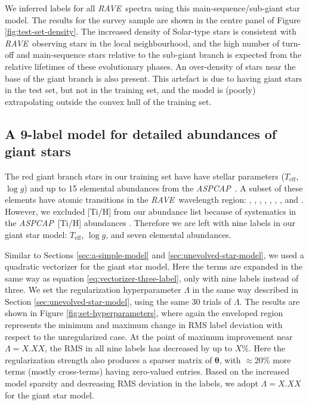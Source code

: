 \documentclass[preprint,trackchanges]{aastex}
\newcommand{\acronym}[1]{{\small{#1}}}
\newcommand{\project}[1]{\textsl{#1}}
\newcommand{\rave}{\project{\acronym{RAVE}}}
\newcommand{\aspcap}{\project{\acronym{ASPCAP}}}
\newcommand{\teff}{T_{\mathrm{eff}}}
\newcommand{\logg}{\log g}
\newcommand{\Dvector}[1]{\boldsymbol{#1}}
\newcommand{\vectheta}{\Dvector{\theta}}
\begin{document}
We inferred labels for all \rave\ spectra using this main-sequence/sub-giant star model.  
The results for the survey sample are shown in the centre panel of Figure \ref{fig:test-set-density}.  
The increased density of Solar-type stars is consistent with \rave\
observing stars in the local neighbourhood, and the high number of turn-off
and main-sequence stars relative to the sub-giant branch is expected from 
the relative lifetimes of these evolutionary phases.  An over-density
of stars near the base of the giant branch is also present.  This artefact is due 
to having giant stars in the test set, but not in the training set, and the
model is (poorly) extrapolating outside the convex hull of the training set.


\subsection{A 9-label model for detailed abundances of giant stars}
\label{sec:evolved-star-model}

The red giant branch stars in our training set have have stellar parameters 
($\teff$, $\logg$) and up to 15 elemental abundances from the \aspcap\ 
\citep{Garcia_Perez_2016}.  A subset of these elements have atomic transitions in the 
\rave\ wavelength region: \ion{O}{1}, \ion{Mg}{1}, \ion{Al}{1}, , 
\ion{Ca}{2}, \ion{Ti}{1}, \ion{Fe}{1}, and \ion{Ni}{1}.  However, we 
excluded [Ti/H] from our abundance list because of systematics in the \aspcap\
[Ti/H] abundances \citep{Holtzman_2015,Hawkins_2016}.  Therefore we are left 
with nine labels in our giant star model: $\teff$, $\logg$, and seven elemental 
abundances.  


Similar to Sections \ref{sec:a-simple-model} and \ref{sec:unevolved-star-model},
we used a quadratic vectorizer for the giant star model.  Here the terms are 
expanded in the same way as equation \ref{eq:vectorizer-three-label}, only
with nine labels instead of three.  We set the regularization hyperparameter $\Lambda$
in the same way described in Section \ref{sec:unevolved-star-model}, using the same 30 trials of $\Lambda$.
The results are shown in Figure \ref{fig:set-hyperparameters}, where
again the enveloped region represents the minimum and maximum change in RMS label
deviation with respect to the unregularized case.  At the point of maximum improvement 
near $\Lambda = X.XX$, the RMS in all nine labels has decreased by up to $X$\%.  Here the regularization strength also produces a sparser matrix
of $\vectheta$, with $\approx20$\% more terms (mostly cross-terms) having zero-valued entries.
Based on the increased model sparsity and decreasing RMS deviation in the labels, 
we adopt $\Lambda = X.XX$ for the giant star model.
\end{document}
